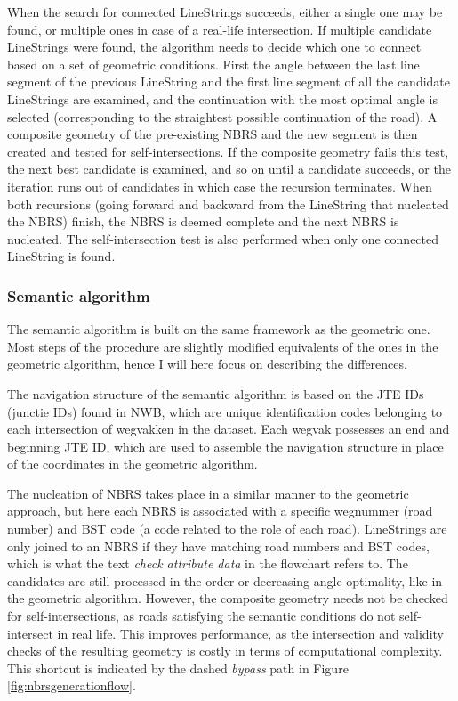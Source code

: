 When the search for connected LineStrings succeeds, either a single one may be found, or multiple ones in case of a real-life intersection. If multiple candidate LineStrings were found, the algorithm needs to decide which one to connect based on a set of geometric conditions. First the angle between the last line segment of the previous LineString and the first line segment of all the candidate LineStrings are examined, and the continuation with the most optimal angle is selected (corresponding to the straightest possible continuation of the road). A composite geometry of the pre-existing NBRS and the new segment is then created and tested for self-intersections. If the composite geometry fails this test, the next best candidate is examined, and so on until a candidate succeeds, or the iteration runs out of candidates in which case the recursion terminates. When both recursions (going forward and backward from the LineString that nucleated the NBRS) finish, the NBRS is deemed complete and the next NBRS is nucleated. The self-intersection test is also performed when only one connected LineString is found.

\subsubsection{Semantic algorithm}

The semantic algorithm is built on the same framework as the geometric one. Most steps of the procedure are slightly modified equivalents of the ones in the geometric algorithm, hence I will here focus on describing the differences.

The navigation structure of the semantic algorithm is based on the JTE IDs (junctie IDs) found in NWB, which are unique identification codes belonging to each intersection of wegvakken in the dataset. Each wegvak possesses an end and beginning JTE ID, which are used to assemble the navigation structure in place of the coordinates in the geometric algorithm.

The nucleation of NBRS takes place in a similar manner to the geometric approach, but here each NBRS is associated with a specific wegnummer (road number) and BST code (a code related to the role of each road). LineStrings are only joined to an NBRS if they have matching road numbers and BST codes, which is what the text \textit{check attribute data} in the flowchart refers to. The candidates are still processed in the order or decreasing angle optimality, like in the geometric algorithm. However, the composite geometry needs not be checked for self-intersections, as roads satisfying the semantic conditions do not self-intersect in real life. This improves performance, as the intersection and validity checks of the resulting geometry is costly in terms of computational complexity. This shortcut is indicated by the dashed \textit{bypass} path in Figure \ref{fig:nbrsgenerationflow}.

